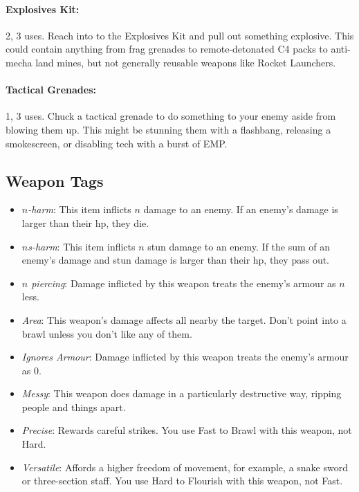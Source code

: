 \paragraph{Explosives Kit:} 2\money, 3 uses. Reach into to the Explosives Kit and pull out something explosive. This could contain anything from frag grenades to remote-detonated C4 packs to anti-mecha land mines, but not generally reusable weapons like Rocket Launchers.
\paragraph{Tactical Grenades:} 1\money, 3 uses. Chuck a tactical grenade to do something to your enemy aside from blowing them up. This might be stunning them with a flashbang, releasing a smokescreen, or disabling tech with a burst of EMP.

\subsection{Weapon Tags}
\begin{itemize}
\item \textit{$n$-harm}: This item inflicts $n$ damage to an enemy. If an enemy's damage is larger than their hp, they die.
\item \textit{$n$s-harm}: This item inflicts $n$ stun damage to an enemy. If the sum of an enemy's damage and stun damage is larger than their hp, they pass out.
\item \textit{$n$ piercing}: Damage inflicted by this weapon treats the enemy's armour as $n$ less. 
\item \textit{Area}: This weapon's damage affects all nearby the target. Don't point into a brawl unless you don't like any of them.
\item \textit{Ignores Armour}: Damage inflicted by this weapon treats the enemy's armour as 0. 
\item \textit{Messy}: This weapon does damage in a particularly destructive way, ripping people and things apart.
\item \textit{Precise}: Rewards careful strikes. You use Fast to Brawl with this weapon, not Hard.
\item \textit{Versatile}: Affords a higher freedom of movement, for example, a snake sword or three-section staff. You use Hard to Flourish with this weapon, not Fast.
\end{itemize}

